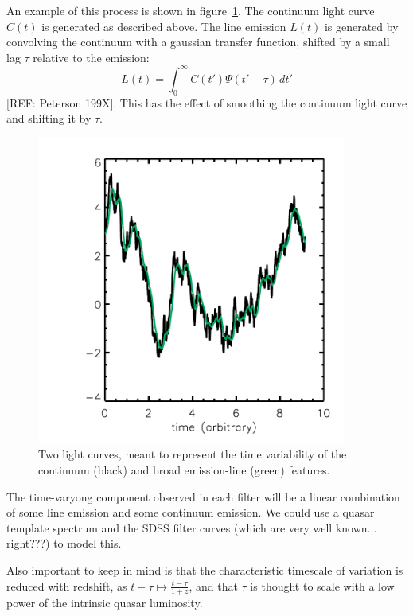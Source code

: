 \documentclass[11pt,a4paper]{article}
\begin{document}
    An example of this process is shown in
    figure~\ref{fig:SampleLightCurves}. The continuum light curve
    $C(t)$ is generated as described above. The line emission $L(t)$
    is generated by convolving the continuum with a gaussian transfer
    function, shifted by a small lag $\tau$ relative to the emission:
    \begin{equation}
      L(t) = \int_{0}^{\infty}C(t')\Psi(t'-\tau)\, dt'
    \end{equation}
    [REF: Peterson 199X]. This has the effect of smoothing the
    continuum light curve and shifting it by $\tau$.
    
    \begin{figure}
      \begin{center}
        \includegraphics[width=4in]{../Plots/sample_lightcurve.pdf}
        \caption{Two light curves, meant to represent the time
          variability of the continuum (black) and broad emission-line
          (green) features.}
        \label{fig:SampleLightCurves}
      \end{center}
    \end{figure}
    
    The time-varyong component observed in each filter will be a
    linear combination of some line emission and some continuum
    emission. We could use a quasar template spectrum and the SDSS
    filter curves (which are very well known... right???) to model
    this.

    Also important to keep in mind is that the characteristic
    timescale of variation is reduced with redshift, as $t-\tau
    \mapsto \frac{t-\tau}{1+z}$, and that $\tau$ is thought to scale
    with a low power of the intrinsic quasar luminosity.
    
\end{document}
